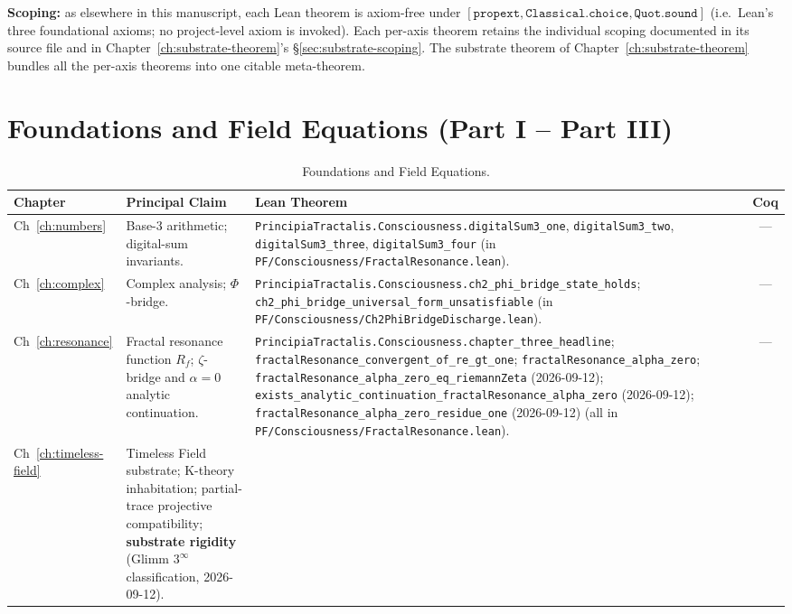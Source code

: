 \textbf{Scoping:} as elsewhere in this manuscript, each Lean
theorem is axiom-free under
$[\texttt{propext}, \texttt{Classical.choice}, \texttt{Quot.sound}]$
(i.e.\ Lean's three foundational axioms; no project-level axiom is
invoked). Each per-axis theorem retains the individual scoping
documented in its source file and in
Chapter~\ref{ch:substrate-theorem}'s
\S\ref{sec:substrate-scoping}. The substrate theorem of
Chapter~\ref{ch:substrate-theorem} bundles all the per-axis
theorems into one citable meta-theorem.

\section{Foundations and Field Equations (Part I -- Part III)}
\label{sec:lean-xref-foundations}

\begin{table}[h]
\centering
\footnotesize
\caption{Foundations and Field Equations.}
\begin{tabular}{p{1.7cm}p{4.2cm}p{5.6cm}c}
\toprule
\textbf{Chapter} & \textbf{Principal Claim} & \textbf{Lean Theorem} & \textbf{Coq} \\
\midrule
Ch~\ref{ch:numbers}
& Base-3 arithmetic; digital-sum invariants.
& \texttt{PrincipiaTractalis.Consciousness.digitalSum3\_one}, \texttt{digitalSum3\_two}, \texttt{digitalSum3\_three}, \texttt{digitalSum3\_four} (in \texttt{PF/Consciousness/FractalResonance.lean}).
& --- \\
Ch~\ref{ch:complex}
& Complex analysis; $\Phi$-bridge.
& \texttt{PrincipiaTractalis.Consciousness.ch2\_phi\_bridge\_state\_holds}; \texttt{ch2\_phi\_bridge\_universal\_form\_unsatisfiable} (in \texttt{PF/Consciousness/Ch2PhiBridgeDischarge.lean}).
& --- \\
Ch~\ref{ch:resonance}
& Fractal resonance function $R_f$; $\zeta$-bridge and $\alpha = 0$ analytic continuation.
& \texttt{PrincipiaTractalis.Consciousness.chapter\_three\_headline}; \texttt{fractalResonance\_convergent\_of\_re\_gt\_one}; \texttt{fractalResonance\_alpha\_zero}; \texttt{fractalResonance\_alpha\_zero\_eq\_riemannZeta} (2026-09-12); \texttt{exists\_analytic\_continuation\_fractalResonance\_alpha\_zero} (2026-09-12); \texttt{fractalResonance\_alpha\_zero\_residue\_one} (2026-09-12) (all in \texttt{PF/Consciousness/FractalResonance.lean}).
& --- \\
Ch~\ref{ch:timeless-field}
& Timeless Field substrate; K-theory inhabitation; partial-trace projective compatibility; \textbf{substrate rigidity} (Glimm $3^\infty$ classification, 2026-09-12).

\end{tabular}
\end{table}
